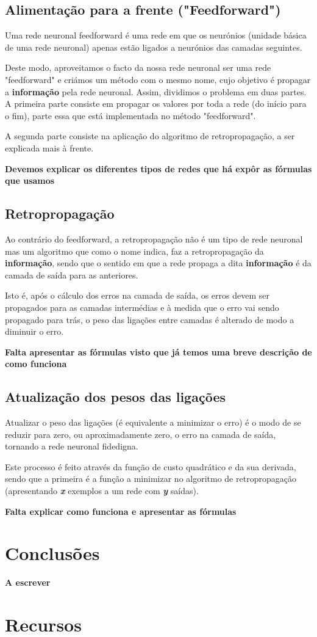 \documentclass[10pt,a4paper]{article}
\begin{document}
\subsection{Alimentação para a frente ("Feedforward")}
Uma rede neuronal feedforward é uma rede em que os neurónios (unidade básica de uma rede neuronal) apenas estão ligados a neurónios das camadas seguintes.

Deste modo, aproveitamos o facto da nossa rede neuronal ser uma rede "feedforward" e criámos um método com o mesmo nome, cujo objetivo é propagar a  \textbf{informação} pela rede neuronal.
Assim, dividimos o problema em duas partes.
A primeira parte consiste em propagar os valores por toda a rede (do início para o fim), parte essa que está implementada no método "feedforward".

A segunda parte consiste na aplicação do algoritmo de retropropagação, a ser explicada mais à frente.

 \textbf{Devemos explicar os diferentes tipos de redes que há expôr as fórmulas que usamos}

\subsection{Retropropagação}
Ao contrário do feedforward, a retropropagação não é um tipo de rede neuronal mas um algoritmo que como o nome indica, faz a retropropagação da \textbf{informação}, sendo que o sentido em que a rede propaga a dita \textbf{informação} é da camada de saída para as anteriores.

Isto é, após o cálculo dos erros na camada de saída, os erros devem ser propagados para as camadas intermédias e à medida que o erro vai sendo propagado para trás, o peso das ligações entre camadas é alterado de modo a diminuir o erro.


 \textbf{Falta apresentar as fórmulas visto que já temos uma breve descrição de como funciona}

\subsection{Atualização dos pesos das ligações}
Atualizar o peso das ligações (é equivalente a minimizar o erro) é o modo de se reduzir para zero, ou aproximadamente zero, o erro na camada de saída, tornando a rede neuronal fidedigna.

Este processo é feito através da função de custo quadrático e da sua derivada, sendo que a primeira é a função a minimizar no algoritmo de retropropagação (apresentando \textbf{\textit{x}} exemplos a um rede com \textbf{\textit{y}} saídas).

 \textbf{Falta explicar como funciona e apresentar as fórmulas}
 
\section{Conclusões}
\textbf{A escrever}

\section{Recursos}
\end{document}
